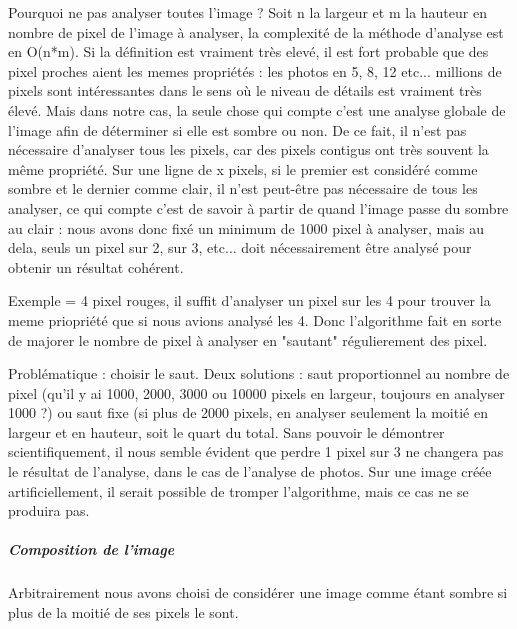 				Pourquoi ne pas analyser toutes l'image ?
				Soit n la largeur et m la hauteur en nombre de pixel de l'image à analyser, la complexité de la méthode d'analyse est en O(n*m). Si la définition est vraiment très elevé, il est fort probable que des pixel proches aient les memes propriétés : les photos en 5, 8, 12 etc... millions de pixels sont intéressantes dans le sens où le niveau de détails est vraiment très élevé. Mais dans notre cas, la seule chose qui compte c'est une analyse globale de l'image afin de déterminer si elle est sombre ou non. De ce fait, il n'est pas nécessaire d'analyser tous les pixels, car des pixels contigus ont très souvent la même propriété. Sur une ligne de x pixels, si le premier est considéré comme sombre et le dernier comme clair, il n'est peut-être pas nécessaire de tous les analyser, ce qui compte c'est de savoir à partir de quand l'image passe du sombre au clair : nous avons donc fixé un minimum de 1000 pixel à analyser, mais au dela, seuls un pixel sur 2, sur 3, etc... doit nécessairement être analysé pour obtenir un résultat cohérent.

				Exemple = 4 pixel rouges, il suffit d'analyser un pixel sur les 4 pour trouver la meme priopriété que si nous avions analysé les 4. Donc l'algorithme fait en sorte de majorer le nombre de pixel à analyser en "sautant" régulierement des pixel.

				Problématique : choisir le saut. Deux solutions : saut proportionnel au nombre de pixel (qu'il y ai 1000, 2000, 3000 ou 10000 pixels en largeur, toujours en analyser 1000 ?) ou saut fixe (si plus de 2000 pixels, en analyser seulement la moitié en largeur et en hauteur, soit le quart du total.
				Sans pouvoir le démontrer scientifiquement, il nous semble évident que perdre 1 pixel sur 3 ne changera pas le résultat de l'analyse, dans le cas de l'analyse de photos. Sur une image créée artificiellement, il serait possible de tromper l'algorithme, mais ce cas ne se produira pas.

				
			\subparagraph{Composition de l'image}
					Arbitrairement nous avons choisi de considérer une image comme étant sombre si plus de la moitié de ses pixels le sont.
					

